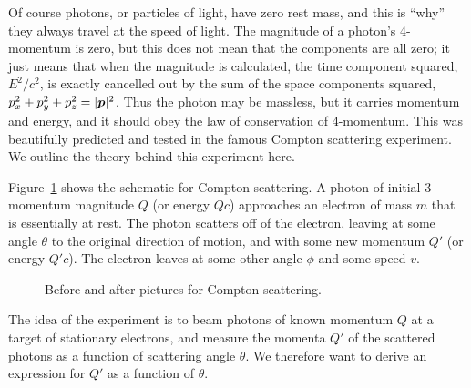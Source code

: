 Of course photons, or particles of light, have zero rest mass, and
this is ``why'' they always travel at the speed of light.  The
magnitude of a photon's 4-momentum is zero, but this does not mean
that the components are all zero; it just means that when the
magnitude is calculated, the time component squared, $E^2/c^2$, is
exactly cancelled out by the sum of the space components squared,
$p_x^2+p_y^2+p_z^2=|\mbox{\boldmath $p$}|^2$.  Thus the photon may be massless, but
it carries momentum and energy, and it should obey the law of
conservation of 4-momentum.  This was beautifully predicted and tested
in the famous Compton scattering experiment.  We outline the theory
behind this experiment here.

Figure~\ref{fig:compton} shows the schematic for Compton scattering.
A photon of initial 3-momentum magnitude $Q$ (or energy $Qc$)
approaches an electron of mass $m$ that is essentially at rest.  The
photon scatters off of the electron, leaving at some angle $\theta$ to
the original direction of motion, and with some new momentum $Q'$ (or
energy $Q'c$).  The electron leaves at some other angle $\phi$ and
some speed $v$.
\begin{figure}
\caption{Before and after pictures for Compton scattering.}
\label{fig:compton}
\end{figure}
The idea of the experiment is to beam photons of known momentum $Q$ at
a target of stationary electrons, and measure the momenta $Q'$ of the
scattered photons as a function of scattering angle $\theta$.  We
therefore want to derive an expression for $Q'$ as a function of
$\theta$.

